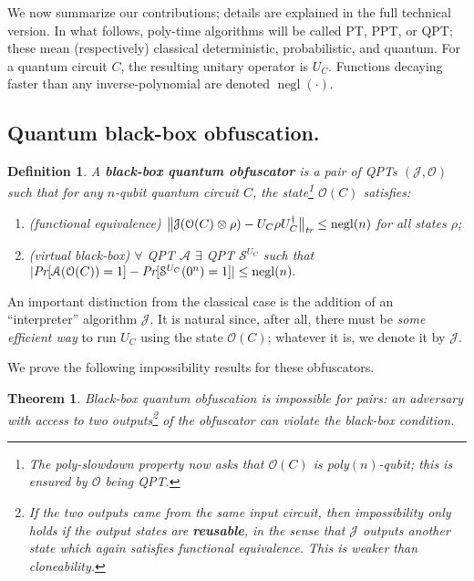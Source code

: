 \documentclass[11pt]{amsart}
\numberwithin{equation}{section}
\newtheorem{theorem}{Theorem}
\newtheorem{definition}{Definition}
\newcommand{\opn}{\operatorname}
\newcommand{\algo}{\mathcal}
\newcommand{\negl}{\opn{negl}}
\begin{document}
We now summarize our contributions; details are explained in the full technical version. In what follows, poly-time algorithms will be called PT, PPT, or QPT; these mean (respectively) classical deterministic, probabilistic, and quantum. For a quantum circuit $C$, the resulting unitary operator is $U_C$. Functions decaying faster than any inverse-polynomial are denoted $\negl(\cdot)$.

\subsection{Quantum black-box obfuscation.} 

\begin{definition}\label{def:vbb-obfuscator}
A \textbf{black-box quantum obfuscator} is a pair of QPTs $(\algo J, \algo O)$ such that for any $n$-qubit quantum circuit $C$, the state\footnote{The poly-slowdown property now asks that $\mathcal O(C)$ is poly$(n)$-qubit; this is ensured by $\algo O$ being QPT.} $\mathcal O(C)$ satisfies:
\begin{enumerate}
\item (functional equivalence) $\bigl\| \algo J ( \algo O(C) \otimes \rho ) - U_C \rho U_C^\dagger \bigr\|_\emph{tr} \leq \negl(n)$ for all states $\rho$;
\item (virtual black-box) $\forall$ QPT $\mathcal A$ $\exists$ QPT $\mathcal S^{U_C}$ such that
$| \emph{Pr}[\mathcal A(\mathcal O(C)) = 1] - \emph{Pr}[\mathcal S^{U_C}(0^n) = 1]| \leq \negl(n).$
\end{enumerate}
\end{definition}

\noindent An important distinction from the classical case is the addition of an ``interpreter'' algorithm $\algo J$. It is natural since, after all, there must be \emph{some efficient way} to run $U_C$ using the state $\algo O(C)$; whatever it is, we denote it by $\algo J$. 

We prove the following impossibility results for these obfuscators.

\begin{theorem}\label{thm:main}
Black-box quantum obfuscation is impossible for pairs: an adversary with access to two outputs\footnote{If the two outputs came from the same input circuit, then impossibility only holds if the output states are \textbf{reusable}, in the sense that $\algo J$ outputs another state which again satisfies functional equivalence. This is weaker than cloneability.} of the obfuscator can violate the black-box condition.
\end{theorem}
\end{document}
